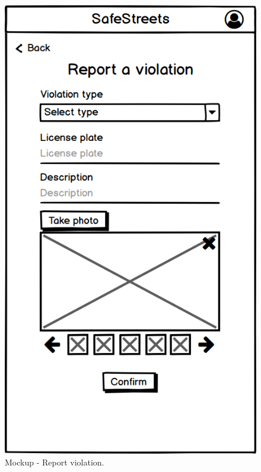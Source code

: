 \begin{@empty}
\begin{figure}[H]
\begin{minipage}{.4\textwidth}
    \includegraphics[width=.8\textwidth]{Images/report-violation.png}
    \caption{\label{fig:mockup-report-violation}Mockup - Report violation.}
\end{minipage}
\end{figure}


\end{@empty}
